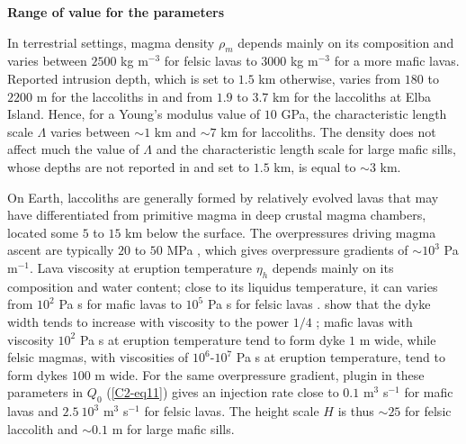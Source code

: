 \vspace{.5cm} \textbf{Range of value for the parameters} \vspace{.5cm}

In terrestrial settings, magma density  $\rho_m$ depends mainly on its
composition and varies between $ 2500$ kg m$^{-3}$ for felsic lavas to
$3000$ kg m$^{-3}$ for a  more mafic lavas.  Reported intrusion depth,
which is set to $1.5$ km otherwise,  varies from $180$ to $2200$ m for
the laccoliths in \citet{E:2015tl} and from  $1.9$ to $3.7$ km for the
laccoliths at Elba Island.  Hence, for a Young's modulus value of $10$
GPa, the characteristic length scale $\Lambda$ varies between $\sim 1$
km and $\sim  7$ km for laccoliths.  The density  does not affect much
the value of  $\Lambda$ and the characteristic length  scale for large
mafic sills,  whose depths are  not reported in  \citet{Cruden:tg} and
set to $1.5$ km, is equal to $\sim 3$ km.

On Earth, laccoliths are generally  formed by relatively evolved lavas
that  may have  differentiated from  primitive magma  in deep  crustal
magma chambers,  located some $5$  to $15$  km below the  surface. The
overpressures  driving magma  ascent are  typically $20$  to $50$  MPa
\citep{Stasiuk:1993kg,Barmin:2002ea},    which   gives    overpressure
gradients  of $\sim  10^3$ Pa  m$^{−1}$.  Lava  viscosity at  eruption
temperature  $\eta_h$  depends mainly  on  its  composition and  water
content; close to its liquidus  temperature, it can varies from $10^2$
Pa  s   for  mafic   lavas  to   $10^{5}$  Pa   s  for   felsic  lavas
\citep{Anonymous:CZVBrBvv,Giordano:2008em,Whittington:2009fv,Chevrel:2013jn}.
\citet{Wada:2007tv} show  that the dyke  width tends to  increase with
viscosity  to the  power $1/4$  \citep{Kerr:1995tl}; mafic  lavas with
viscosity $10^2$ Pa s at eruption  temperature tend to form dyke $1$ m
wide, while felsic  magmas, with viscosities of $10^6$-$10^7$  Pa s at
eruption temperature, tend  to form dykes $100$ m wide.   For the same
overpressure   gradient,  plugin   in   these   parameters  in   $Q_0$
(\ref{C2-eq11}) gives an injection rate  close to $0.1$ m$^3$ s$^{-1}$
for mafic  lavas and $2.5~10^3$  m$^3$ s$^{-1}$ for felsic  lavas. The
height scale $H$ is thus $\sim 25$ for felsic laccolith and $\sim 0.1$
m for large mafic sills.

